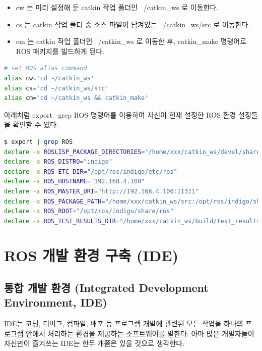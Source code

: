\begin{itemize}[leftmargin=*]
\item cw 는 미리 설정해 둔 catkin 작업 폴더인 ~/catkin\_ws 로 이동한다. 
\item cs 는 catkin 작업 폴더 중 소스 파일이 담겨있는 ~/catkin\_ws/src 로 이동한다. 
\item cm 는 catkin 작업 폴더인 ~/catkin\_ws 로 이동한 후, catkin\_make 명령어로 ROS 패키지를 빌드하게 된다.
\end{itemize}

\vspace{\baselineskip}
\begin{lstlisting}[language=bash]
# set ROS alias command
alias cw='cd ~/catkin_ws'
alias cs='cd ~/catkin_ws/src'
alias cm='cd ~/catkin_ws && catkin_make'
\end{lstlisting}

\begin{exercise}[ROS 환경 설정 확인 방법]
아래처럼 export \textbar~grep ROS 명령어를 이용하여 자신이 현재 설정한 ROS 환경 설정들을 확인할 수 있다.
\begin{lstlisting}[language=bash, backgroundcolor=\color{ocre!10}, numbers=none]
$ export | grep ROS
declare -x ROSLISP_PACKAGE_DIRECTORIES="/home/xxx/catkin_ws/devel/share/common-lisp"
declare -x ROS_DISTRO="indigo"
declare -x ROS_ETC_DIR="/opt/ros/indigo/etc/ros"
declare -x ROS_HOSTNAME="192.168.4.100"
declare -x ROS_MASTER_URI="http://192.168.4.100:11311"
declare -x ROS_PACKAGE_PATH="/home/xxx/catkin_ws/src:/opt/ros/indigo/share:/opt/ros/indigo/stacks"
declare -x ROS_ROOT="/opt/ros/indigo/share/ros"
declare -x ROS_TEST_RESULTS_DIR="/home/xxx/catkin_ws/build/test_results"
\end{lstlisting}
\end{exercise}

\section{ROS 개발 환경 구축 (IDE)}

\subsection{통합 개발 환경 (Integrated Development Environment, IDE)}

IDE는 코딩, 디버그, 컴파일, 배포 등 프로그램 개발에 관련된 모든 작업을 하나의 프로그램 안에서 처리하는 환경을 제공하는 소프트웨어를 말한다. 아마 많은 개발자들이 자신만이 즐겨쓰는 IDE는 한두 개쯤은 있을 것으로 생각한다. 

